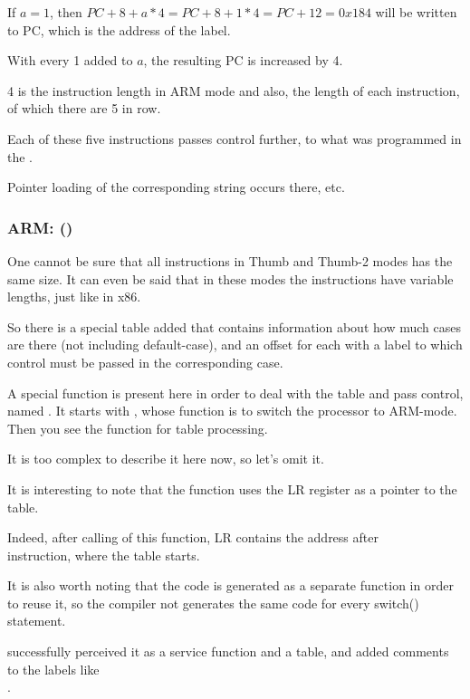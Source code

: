 If $a=1$, then $PC+8+a*4 = PC+8+1*4 = PC+12 = 0x184$ will be written to \ac{PC},
which is the address of the  label.

With every 1 added to $a$, the resulting \ac{PC} is increased by 4.

4 is the instruction length in ARM mode and also, the length of each  instruction,
of which there are 5 in row.

Each of these five  instructions passes control further, to what was programmed in the .

Pointer loading of the corresponding string occurs there, etc.

\subsubsection{ARM: \OptimizingKeilVI (\ThumbMode)}




One cannot be sure that all instructions in Thumb and Thumb-2 modes has the same size.
It can even be said that in these modes the instructions have variable lengths, just like in x86.


So there is a special table added that contains information about how much cases are there (not including 
default-case), and an offset for each with a label to which control must be passed in 
the corresponding case.


A special function is present here in order to deal with the table and pass control, \\
named . 
It starts with , whose function is to switch the processor to ARM-mode.
Then you see the function for table processing. 

It is too complex to describe it here now, so let's omit it.


It is interesting to note that the function uses the \ac{LR} register as a pointer to the table.

Indeed, after calling of this function, \ac{LR} contains the address after\\
 instruction, where the table starts.

It is also worth noting that the code is generated as a separate function in order to reuse it, 
so the compiler not generates the same code for every switch() statement.

\IDA successfully perceived it as a service function and a table, and added comments to the labels like\\
.

